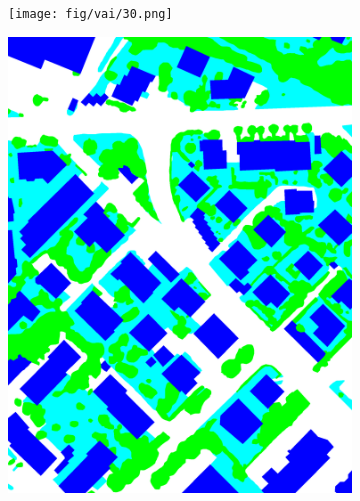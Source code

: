 \begin{figure}[htb]
 \begin{subfigure}{0.24\textwidth}
   \centering
   \texttt{[image: fig/vai/30.png]} 
 \end{subfigure}\vspace{1mm}
 \begin{subfigure}{0.24\textwidth}
   \centering
   \includegraphics[width=1\linewidth]{fig/vai/30_gt.png}
 \end{subfigure}
 \begin{subfigure}{0.24\textwidth}
   \centering

\end{subfigure}
\end{figure}
